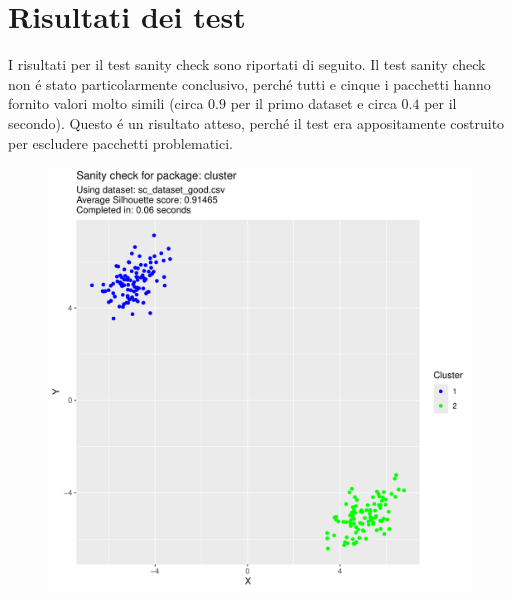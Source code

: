 \documentclass[12pt]{report}
\begin{document}
		\section{Risultati dei test}

			I risultati per il test sanity check sono riportati di seguito.
			Il test sanity check non é stato particolarmente conclusivo,
			perché tutti e cinque i pacchetti hanno fornito valori molto
			simili (circa $0.9$ per il primo dataset e circa $0.4$ per il
			secondo). Questo é un risultato atteso, perché il test era
			appositamente costruito per escludere pacchetti problematici.

			\begin{figure}[h]
				\begin{boxedminipage}{0.5\textwidth}
					\includegraphics[width = \textwidth, page = 1]{results/results_CLUSTER.pdf}
				\end{boxedminipage}
				\begin{boxedminipage}{0.5\textwidth}

\end{boxedminipage}
\end{figure}
\end{document}
